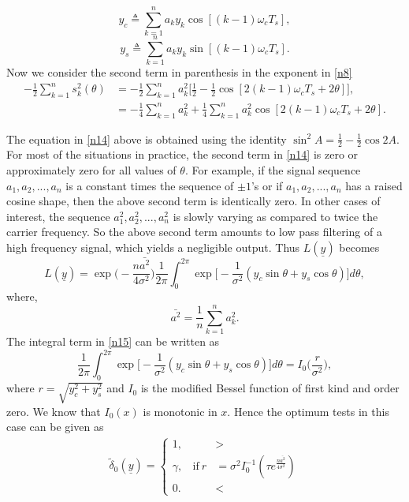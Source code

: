\documentclass[a4paper,english,12pt]{article}
\begin{document}
\begin{equation*}
y_c \triangleq \sum_{k=1}^{n}a_k y_k \cos[(k-1)\omega_c T_s],
\end{equation*}
\begin{equation*}
y_s \triangleq \sum_{k=1}^{n}a_k y_k \sin[(k-1)\omega_c T_s].
\end{equation*}
Now we consider the second term in parenthesis in the exponent in \eqref{n8}
\begin{align}
-\frac{1}{2}\sum_{k=1}^{n}s_k^2(\theta) &= -\frac{1}{2}\sum_{k=1}^{n}a_k^2\bigg[\frac{1}{2}-\frac{1}{2}\cos[2(k-1)\omega_c T_s+2\theta]\bigg], 
 \label{n14}\\\nonumber
&=-\frac{1}{4}\sum_{k=1}^{n}a_k^2+\frac{1}{4}\sum_{k=1}^{n}a_k^2 \cos[2(k-1)\omega_c T_s+2\theta].
\end{align}
\par The equation in \eqref{n14} above is obtained using the identity $\sin^2A= \frac{1}{2}-\frac{1}{2}\cos2A$.
For most of the situations in practice, the second term in \eqref{n14} is zero or approximately zero for all values of $\theta$. For example, if the signal sequence $a_1,a_2,...,a_n$ is a constant times the sequence of $\pm1$'s or if $a_1,a_2,...,a_n$ has a raised cosine shape, then the above second term is identically zero. In other cases of interest, the sequence $a_1^2,a_2^2,...,a_n^2$ is slowly varying as compared to twice the carrier frequency. So the above second term amounts to low pass filtering of a high frequency signal, which yields a negligible output. Thus $L(\underline{y})$ becomes
\begin{equation}
 \label{n15}
L(\underline{y})=\exp\bigg(-\frac{n\bar{a^2}}{4\sigma^2}\bigg)  \frac{1}{2\pi}\int_{0}^{2\pi}\exp\bigg[-\frac{1}{\sigma^2}( y_c \sin\theta +y_s \cos\theta)\bigg]d\theta,
\end{equation}
where,
\begin{equation}
 \label{n16}
\bar{a^2}=\frac{1}{n}\sum_{k=1}^{n}a_k^2.
\end{equation}
The integral term in \eqref{n15} can be written as
\begin{equation}
 \label{n17}
\frac{1}{2\pi}\int_{0}^{2\pi}\exp\bigg[-\frac{1}{\sigma^2}( y_c \sin\theta +y_s \cos\theta)\bigg]d\theta= I_0\bigg(\frac{r}{\sigma^2}\bigg),
\end{equation}
where $r=\sqrt{y_c^2+y_s^2}$ and $I_0$ is the modified Bessel function of first kind and order zero. We know that $I_0(x)$ is monotonic in $x$. Hence the optimum tests in this case can be given as
\begin{align}
 \label{n18}
\tilde{\delta}_0 (\underline{y}) =  
\begin{cases}
1, &>  \\
\gamma,  \ \ \ \  \mbox{if}~r&= \sigma^2I_0^{-1} (\tau e^{\frac{n\bar{a^2}}{4\sigma^2}}) \\
0. &<
\end{cases}
\end{align}
\end{document}
